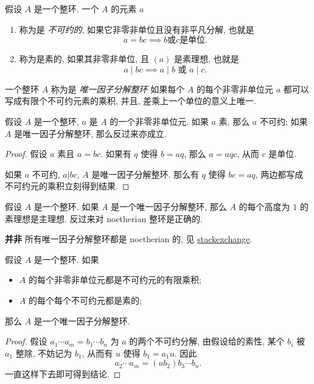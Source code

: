 假设 \( A \) 是一个整环. 一个 \( A \) 的元素 \( a \) 
\begin{enumerate}
  \item 称为是 \emph{不可约的},
    如果它非零非单位且没有非平凡分解, 也就是
    \[
      a = bc \implies b \text{或} c \text{是单位}.
    \]
  \item 称为是素的, 如果其非零非单位, 且 \( (a) \) 是素理想, 也就是
    \[
      a \mid bc \implies a \mid b \text{ 或 } a \mid c.
    \]
\end{enumerate}
一个整环 \( A \) 称为是 \emph{唯一因子分解整环} 如果每个 \( A \)
的每个非零非单位元 \( a \) 都可以写成有限个不可约元素的乘积, 并且,
差乘上一个单位的意义上唯一.

\begin{proposition}
  假设 \( A \) 是一个整环, \( a \) 是 \( A \) 的一个非零非单位元. 如果 \( a \)
  素, 那么 \( a \) 不可约; 如果 \( A \) 是唯一因子分解整环, 那么反过来亦成立.
\end{proposition}
\begin{proof}
  假设 \( a \) 素且 \( a = bc \). 如果有 \( q \) 使得 \( b = aq \), 那么 \( a =
  aqc \), 从而 \( c \) 是单位.

  如果 \( a \) 不可约, \( a | bc \), \( A \) 是唯一因子分解整环. 那么有 \( q \)
  使得 \( bc = aq \), 两边都写成不可约元的乘积立刻得到结果.
\end{proof}

\begin{corollary}
  假设 \( A \) 是一个整环. 如果 \( A \) 是一个唯一因子分解整环, 那么 \( A \)
  的每个高度为 \( 1 \) 的素理想是主理想.
  反过来对 noetherian 整环是正确的.
\end{corollary}
\begin{remark}
  \textbf{并非} 所有唯一因子分解整环都是 noetherian 的, 见
  \href{https://math.stackexchange.com/questions/254226/does-ufd-imply-noetherian}{stackexchange}.
\end{remark}

\begin{proposition}
  假设 \( A \) 是一个整环. 如果
  \begin{itemize}
    \item \( A \) 的每个非零非单位元都是不可约元的有限乘积;
    \item \( A \) 的每个每个不可约元都是素的;
  \end{itemize}
  那么 \( A \) 是一个唯一因子分解整环.
\end{proposition}
\begin{proof}
  假设 \( a_1 \cdots a_m = b_1 \cdots b_n \) 为 \( a \) 的两个不可约分解,
  由假设给的素性, 某个 \( b_i \) 被 \( a_1 \) 整除, 不妨记为 \( b_1 \), 从而有
  \( u \) 使得 \( b_1 = a_1 u \). 因此
  \[
    a_2 \cdots a_m = (ub_2)b_3 \cdots b_n.
  \]
  一直这样下去即可得到结论.
\end{proof}


